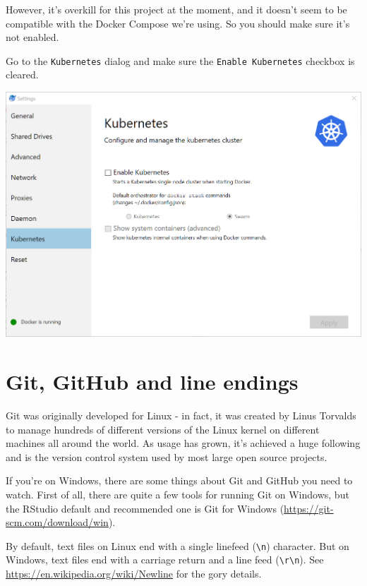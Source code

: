 \documentclass[]{book}
\theoremstyle{definition}
\theoremstyle{definition}
\theoremstyle{definition}
\theoremstyle{remark}
\begin{document}
However, it's overkill for this project at the moment, and it doesn't
seem to be compatible with the Docker Compose we're using. So you should
make sure it's not enabled.

Go to the \texttt{Kubernetes} dialog and make sure the
\texttt{Enable\ Kubernetes} checkbox is cleared.

\begin{center}\includegraphics[width=0.9\linewidth]{screenshots/2018-08-26_15_26_22-Kubernetes} \end{center}

\hypertarget{git-github-and-line-endings}{%
\section{Git, GitHub and line
endings}\label{git-github-and-line-endings}}

Git was originally developed for Linux - in fact, it was created by
Linus Torvalds to manage hundreds of different versions of the Linux
kernel on different machines all around the world. As usage has grown,
it's achieved a huge following and is the version control system used by
most large open source projects.

If you're on Windows, there are some things about Git and GitHub you
need to watch. First of all, there are quite a few tools for running Git
on Windows, but the RStudio default and recommended one is Git for
Windows (\url{https://git-scm.com/download/win}).

By default, text files on Linux end with a single linefeed
(\texttt{\textbackslash{}n}) character. But on Windows, text files end
with a carriage return and a line feed
(\texttt{\textbackslash{}r\textbackslash{}n}). See
\url{https://en.wikipedia.org/wiki/Newline} for the gory details.
\end{document}
